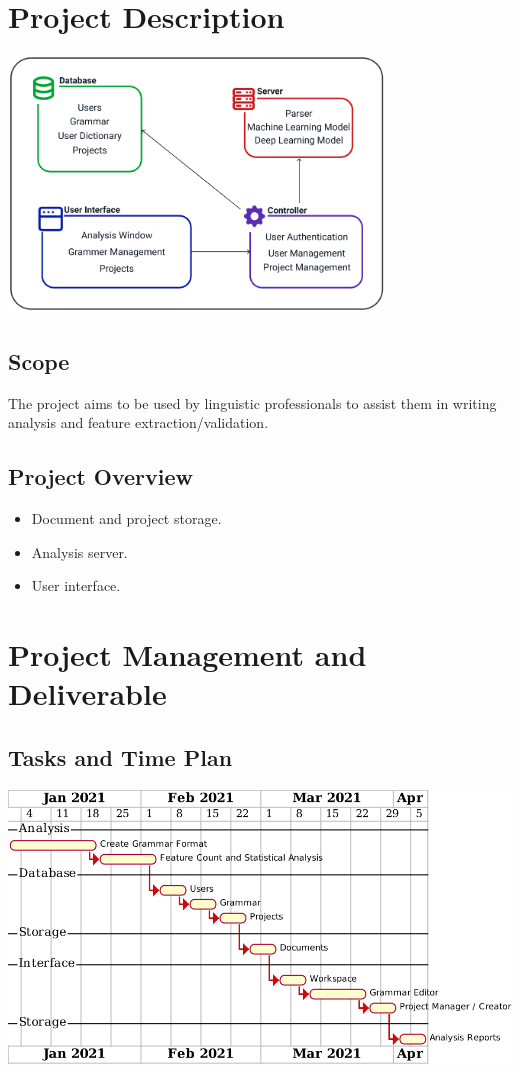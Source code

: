 \documentclass[12pt]{article}
\begin{document}
\section{Project Description}
\includegraphics[width=10cm]{Images/System Overview.png}
\subsection{Scope}
The project aims to be used by linguistic professionals to assist them in writing analysis and feature extraction/validation.
\subsection{Project Overview}
\begin{itemize}
    \item Document and project storage.
    \item Analysis server.
    \item User interface.
\end{itemize}

\section{Project Management and Deliverable}
\subsection{Tasks and Time Plan}
\includegraphics[width=15cm]{Images/gantt.png}
\end{document}
